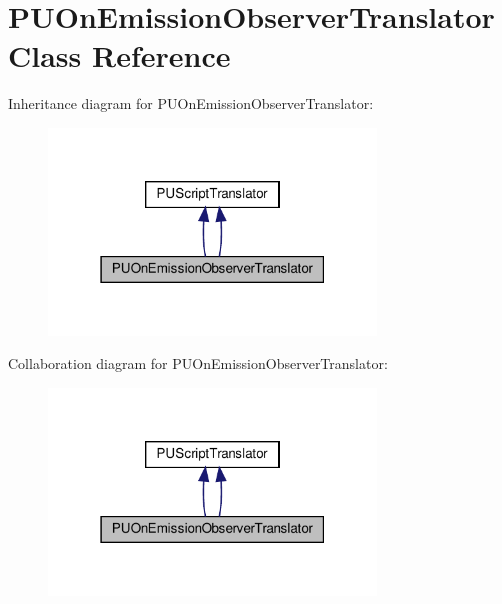 \hypertarget{classPUOnEmissionObserverTranslator}{}\section{P\+U\+On\+Emission\+Observer\+Translator Class Reference}
\label{classPUOnEmissionObserverTranslator}


Inheritance diagram for P\+U\+On\+Emission\+Observer\+Translator\+:
\nopagebreak
\begin{figure}[H]
\begin{center}
\leavevmode
\includegraphics[width=247pt]{classPUOnEmissionObserverTranslator__inherit__graph}
\end{center}
\end{figure}


Collaboration diagram for P\+U\+On\+Emission\+Observer\+Translator\+:
\nopagebreak
\begin{figure}[H]
\begin{center}
\leavevmode
\includegraphics[width=247pt]{classPUOnEmissionObserverTranslator__coll__graph}
\end{center}
\end{figure}
